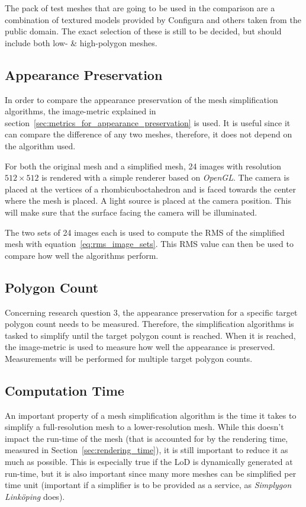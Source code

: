         The pack of test meshes that are going to be used in the comparison are a combination of textured models provided by Configura and others taken from the public domain. The exact selection of these is still to be decided, but should include both low- \& high-polygon meshes.

        \subsection{Appearance Preservation} \label{sec:appearance_preservation}
        In order to compare the appearance preservation of the mesh simplification algorithms, the image-metric explained in section~\ref{sec:metrics_for_appearance_preservation} is used. It is useful since it can compare the difference of any two meshes, therefore, it does not depend on the algorithm used.

        For both the original mesh and a simplified mesh, 24 images with resolution $512 \times 512$ is rendered with a simple renderer based on \emph{OpenGL}. The camera is placed at the vertices of a rhombicuboctahedron and is faced towards the center where the mesh is placed. A light source is placed at the camera position. This will make sure that the surface facing the camera will be illuminated.

        The two sets of 24 images each is used to compute the RMS of the simplified mesh with equation~\ref{eq:rms_image_sets}. This RMS value can then be used to compare how well the algorithms perform. 
        \subsection{Polygon Count} \label{sec:polygon_count}
        Concerning research question 3, the appearance preservation for a specific target polygon count needs to be measured. Therefore, the simplification algorithms is tasked to simplify until the target polygon count is reached. When it is reached, the image-metric is used to measure how well the appearance is preserved. Measurements will be performed for multiple target polygon counts. 

        \subsection{Computation Time} \label{sec:computation_time}

        An important property of a mesh simplification algorithm is the time it takes to simplify a full-resolution mesh to a lower-resolution mesh. While this doesn't impact the run-time of the mesh (that is accounted for by the rendering time, measured in Section~\ref{sec:rendering_time}), it is still important to reduce it as much as possible. This is especially true if the LoD is dynamically generated at run-time, but it is also important since many more meshes can be simplified per time unit (important if a simplifier is to be provided as a service, as \emph{Simplygon Linköping} does).

